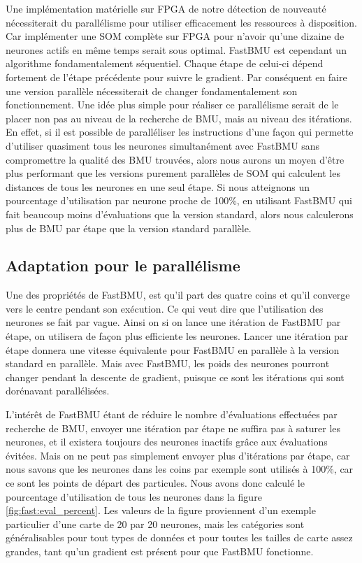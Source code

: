 	Une implémentation matérielle sur FPGA de notre détection de nouveauté nécessiterait du parallélisme pour utiliser efficacement les ressources à disposition. Car implémenter une SOM complète sur FPGA pour n'avoir qu'une dizaine de neurones actifs en même temps serait sous optimal. FastBMU est cependant un algorithme fondamentalement séquentiel. Chaque étape de celui-ci dépend fortement de l'étape précédente pour suivre le gradient. Par conséquent en faire une version parallèle nécessiterait de changer fondamentalement son fonctionnement. Une idée plus simple pour réaliser ce parallélisme serait de le placer non pas au niveau de la recherche de BMU, mais au niveau des itérations. En effet, si il est possible de paralléliser les instructions d'une façon qui permette d'utiliser quasiment tous les neurones simultanément avec FastBMU sans compromettre la qualité des BMU trouvées, alors nous aurons un moyen d'être plus performant que les versions purement parallèles de SOM qui calculent les distances de tous les neurones en une seul étape. Si nous atteignons un pourcentage d'utilisation par neurone proche de 100\%, en utilisant FastBMU qui fait beaucoup moins d'évaluations que la version standard, alors nous calculerons plus de BMU par étape que la version standard parallèle.

	\subsection{Adaptation pour le parallélisme}

	Une des propriétés de FastBMU, est qu'il part des quatre coins et qu'il converge vers le centre pendant son exécution. Ce qui veut dire que l'utilisation des neurones se fait par vague. Ainsi on si on lance une itération de FastBMU par étape, on utilisera de façon plus efficiente les neurones. Lancer une itération par étape donnera une vitesse équivalente pour FastBMU en parallèle à la version standard en parallèle. Mais avec FastBMU, les poids des neurones pourront changer pendant la descente de gradient, puisque ce sont les itérations qui sont dorénavant parallélisées.

	L'intérêt de FastBMU étant de réduire le nombre d'évaluations effectuées par recherche de BMU, envoyer une itération par étape ne suffira pas à saturer les neurones, et il existera toujours des neurones inactifs grâce aux évaluations évitées. Mais on ne peut pas simplement envoyer plus d'itérations par étape, car nous savons que les neurones dans les coins par exemple sont utilisés à 100\%, car ce sont les points de départ des particules. Nous avons donc calculé le pourcentage d'utilisation de tous les neurones dans la figure \ref{fig:fast:eval_percent}. Les valeurs de la figure proviennent d'un exemple particulier d'une carte de 20 par 20 neurones, mais les catégories sont généralisables pour tout types de données et pour toutes les tailles de carte assez grandes, tant qu'un gradient est présent pour que FastBMU fonctionne.

